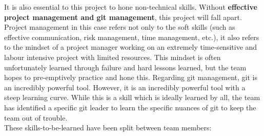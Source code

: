 \documentclass[12pt]{article}
\begin{document}
\begin{enumerate}
It is also essential to this project to hone non-technical skills. Without \textbf{effective project management and git management}, this project will fall apart. Project management in this case refers not only to the soft skills (such as effective communication, risk management, time management, etc.), it also refers to the mindset of a project manager working on an extremely time-sensitive and labour intensive project with limited resources. This mindset is often unfortunately learned through failure and hard lessons learned, but the team hopes to pre-emptively practice and hone this. Regarding git management, git is an incredibly powerful tool. However, it is an incredibly powerful tool with a steep learning curve. While this is a skill which is ideally learned by all, the team has identified a specific git leader to learn the specific nuances of git to keep the team out of trouble. \\
	
	These skills-to-be-learned have been split between team members:


\end{enumerate}
\end{document}
